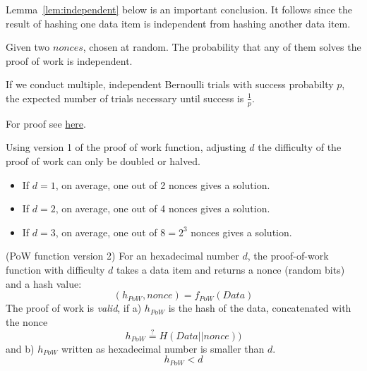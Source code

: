Lemma~\ref{lem:independent} below is an important conclusion. It follows since the result of hashing one data item is independent from hashing another data item.

\begin{lem}\label{lem:independent}
	Given two $nonces$, chosen at random. 
	The probability that any of them solves the proof of work is independent.
\end{lem}



\begin{theorem}
	\label{thm:bernoullitrials}
	If we conduct multiple, independent Bernoulli trials with success probabilty $p$, the expected number of trials necessary until success is $\frac{1}{p}$. 
\end{theorem}

For proof see \href{https://cut-the-knot.org/Probability/LengthToFirstSuccess.shtml}{here}.



\begin{note}
Using version 1 of the proof of work function, adjusting $d$ the difficulty of the proof of work can only be doubled or halved. 
\begin{itemize}
	\item If $d=1$, on average, one out of 2 nonces gives a solution.
	\item If $d=2$, on average, one out of 4 nonces gives a solution.
	\item If $d=3$, on average, one out of $8=2^3$ nonces gives a solution.
\end{itemize}
\end{note}

\begin{definition}\label{def:pow}
	(PoW function version 2)
	For an hexadecimal number $d$,
	the proof-of-work function with difficulty $d$ takes a data item and returns a nonce (random bits) and a hash value:
	\[
		(h_{PoW}, nonce)=f_{PoW}(Data)
	\]
	The proof of work is \emph{valid}, if a) $h_{PoW}$ is the hash of the data, concatenated with the nonce
	\[
		h_{PoW} \overset{?}{=}H(Data || nonce))
	\]
	and b)  $h_{PoW}$ written as hexadecimal number is smaller than $d$.
	\[
		h_{PoW} < d
	\]
\end{definition}


